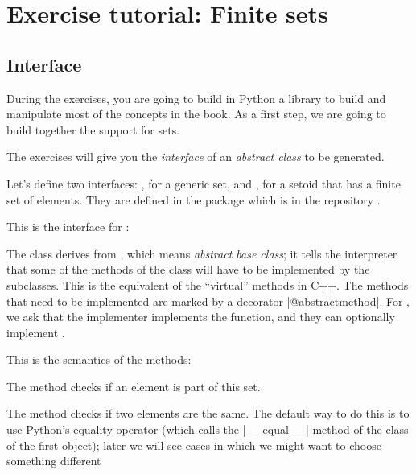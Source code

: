 

\section{Exercise tutorial: Finite sets}\label{sec:exercise-tutorial}

\subsection*{Interface}

During the exercises, you are going to build in Python a library to build and manipulate most of the concepts in the book.
As a first step, we are going to build together the support for sets.

The exercises will give you the \emph{interface} of an \emph{abstract class} to be generated.

Let's define two interfaces: , for a generic set, and , for a setoid that has a finite set of elements. They are defined in the package  which is in the repository .

This is the interface for :


The class   derives from , which means \emph{abstract base class}; it tells the interpreter that some of the methods of the class will have to be implemented by the subclasses.
This is the equivalent of the ``virtual'' methods in C++.
The methods that need to be implemented are marked by a decorator \pystr|@abstractmethod|.
For , we ask that the implementer implements the  function, and they can optionally implement .

This is the semantics of the methods:

\begin{compactitem}
  \item The method  checks if an element is part of this set.
  \item The method  checks if two elements are the same. The default way to do this is to use Python's equality operator (which calls the \pystr|__equal__| method of the class of the first object); later we will see cases in which we might want to choose something different
\end{compactitem}


